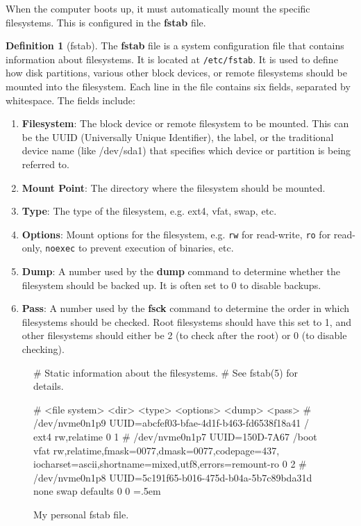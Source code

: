 \documentclass{article}
\theoremstyle{definition}
\newtheorem{definition}{Definition}[section]
\newenvironment{cverbatim}
    {\SaveVerbatim{cverb}}
    {\endSaveVerbatim
    \flushleft\fboxrule=0pt\fboxsep=.5em
    \colorbox{cverbbg}{%
      \makebox[\dimexpr\linewidth-2\fboxsep][l]{\BUseVerbatim{cverb}}%
    }
    \endflushleft
  }
\begin{document}
    When the computer boots up, it must automatically mount the specific filesystems. This is configured in the \textbf{fstab} file. 

    \begin{definition}[fstab]
      The \textbf{fstab} file is a system configuration file that contains information about filesystems. It is located at \texttt{/etc/fstab}. It is used to define how disk partitions, various other block devices, or remote filesystems should be mounted into the filesystem. 
      Each line in the file contains six fields, separated by whitespace. The fields include: 
      \begin{enumerate} 
        \item \textbf{Filesystem}: The block device or remote filesystem to be mounted. This can be the UUID (Universally Unique Identifier), the label, or the traditional device name (like /dev/sda1) that specifies which device or partition is being referred to.
        \item \textbf{Mount Point}: The directory where the filesystem should be mounted. 
        \item \textbf{Type}: The type of the filesystem, e.g. ext4, vfat, swap, etc.
        \item \textbf{Options}: Mount options for the filesystem, e.g. \texttt{rw} for read-write, \texttt{ro} for read-only, \texttt{noexec} to prevent execution of binaries, etc.
        \item \textbf{Dump}: A number used by the \textbf{dump} command to determine whether the filesystem should be backed up. It is often set to $0$ to disable backups. 
        \item \textbf{Pass}: A number used by the \textbf{fsck} command to determine the order in which filesystems should be checked. Root filesystems should have this set to 1, and other filesystems should either be 2 (to check after the root) or 0 (to disable checking). 
      \end{enumerate}
    \end{definition}
    \begin{figure}[hbt!]
      \centering 
      \begin{cverbatim} 
# Static information about the filesystems.
# See fstab(5) for details.

# <file system> <dir> <type> <options> <dump> <pass>
# /dev/nvme0n1p9
UUID=abcfef03-bfae-4d1f-b463-fd6538f18a41	/ ext4 rw,relatime 0 1
# /dev/nvme0n1p7
UUID=150D-7A67 /boot vfat rw,relatime,fmask=0077,dmask=0077,codepage=437,
    iocharset=ascii,shortname=mixed,utf8,errors=remount-ro	0 2
# /dev/nvme0n1p8
UUID=5c191f65-b016-475d-b04a-5b7c89bda31d	none swap defaults 0 0
      \end{cverbatim}
      \caption{My personal fstab file.} 
      \label{fig:fstab}
    \end{figure}
\end{document}
